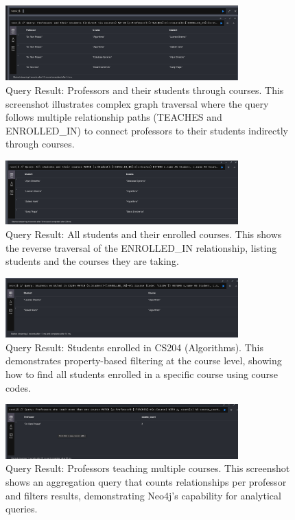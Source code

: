 \begin{figure}[H]
  \centering
  \includegraphics[width=0.8\textwidth]{task-3/screenshots/prof-and-their-students.png}
  \caption{Query Result: Professors and their students through courses. This screenshot illustrates complex graph traversal where the query follows multiple relationship paths (TEACHES and ENROLLED\_IN) to connect professors to their students indirectly through courses.}
  \label{fig:task3-prof-students}
\end{figure}

\begin{figure}[H]
  \centering
  \includegraphics[width=0.8\textwidth]{task-3/screenshots/student-and-their-courses.png}
  \caption{Query Result: All students and their enrolled courses. This shows the reverse traversal of the ENROLLED\_IN relationship, listing students and the courses they are taking.}
  \label{fig:task3-student-courses}
\end{figure}

\begin{figure}[H]
  \centering
  \includegraphics[width=0.8\textwidth]{task-3/screenshots/students-in-cs204.png}
  \caption{Query Result: Students enrolled in CS204 (Algorithms). This demonstrates property-based filtering at the course level, showing how to find all students enrolled in a specific course using course codes.}
  \label{fig:task3-students-cs204}
\end{figure}

\begin{figure}[H]
  \centering
  \includegraphics[width=0.8\textwidth]{task-3/screenshots/who-teaches-more-than-one-course.png}
  \caption{Query Result: Professors teaching multiple courses. This screenshot shows an aggregation query that counts relationships per professor and filters results, demonstrating Neo4j's capability for analytical queries.}
  \label{fig:task3-multi-course-prof}
\end{figure}

